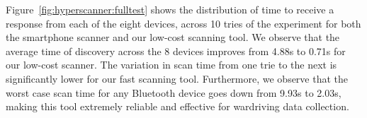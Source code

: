 Figure~\ref{fig:hyperscanner:fulltest} shows the distribution of time to receive a response from each of the eight devices, across 10 tries of the experiment for both the smartphone scanner and our low-cost scanning tool.
%
We observe that the average time of discovery across the 8 devices improves from 4.88s to 0.71s for our low-cost scanner.
%
The variation in scan time from one trie to the next is significantly lower for our fast scanning tool.
%
Furthermore, we observe that the worst case scan time for any Bluetooth device goes down from 9.93s to 2.03s, making this tool extremely reliable and effective for wardriving data collection.

